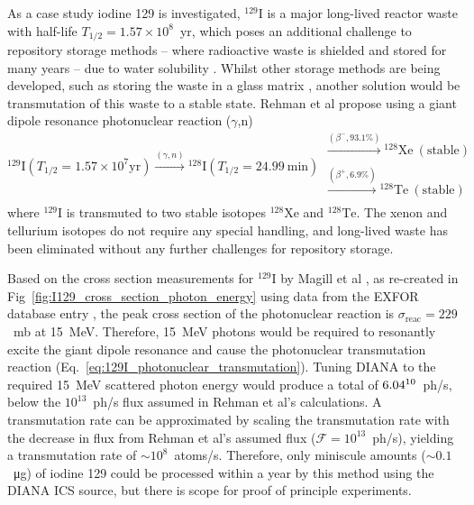 \documentclass[../main.tex]{subfiles}
\begin{document}
As a case study iodine 129 is investigated, $^{129}\mathrm{I}$ is a major long-lived reactor waste with half-life $T_{1/2} = 1.57\times 10^{8}$~yr, which poses an additional challenge to repository storage methods -- where radioactive waste is shielded and stored for many years -- due to water solubility \cite{cho2016reconsideration}. Whilst other storage methods are being developed, such as storing the waste in a glass matrix  \cite{lee2021chemical,morizet2021immobilization}, another solution would be transmutation of this waste to a stable state. Rehman et al \cite{ur2017optimization} propose using a giant dipole resonance photonuclear reaction ($\gamma$,n)
\begin{equation}
^{129}\mathrm{I} \left(T_{1/2}=1.57\times 10^{7}\textrm{yr}\right) \xrightarrow[]{\left(\gamma,n\right)} {}^{128}\mathrm{I} \left(T_{1/2}=24.99~\mathrm{\si{\minute}}\right) \substack{\xrightarrow[]{\left(\beta^{-},93.1\%\right)} {}^{128}\mathrm{Xe}~\left(\mathrm{stable}\right)\\[0.1em] \xrightarrow[]{\left(\beta^{+},6.9\%\right)} {}^{128}\mathrm{Te}~\left(\mathrm{stable}\right)}
\label{eq:129I_photonuclear_transmutation}
\end{equation}
where $^{129}\mathrm{I}$ is transmuted to two stable isotopes $^{128}\mathrm{Xe}$ and $^{128}\mathrm{Te}$. The xenon and tellurium isotopes do not require any special handling, and long-lived waste has been eliminated without any further challenges for repository storage.

Based on the cross section measurements for $^{129}\mathrm{I}$ by Magill et al \cite{magill2003laser}, as re-created in Fig~\ref{fig:I129_cross_section_photon_energy} using data from the EXFOR database entry \cite{zerkin2018experimental}, the peak cross section of the photonuclear reaction is $\sigma_{\mathrm{reac}} = 229$~\si{\milli\barn} at 15~\si{\mega\electronvolt}. Therefore, 15~\si{\mega\electronvolt} photons would be required to resonantly excite the giant dipole resonance and cause the photonuclear transmutation reaction (Eq.~\ref{eq:129I_photonuclear_transmutation}). Tuning DIANA to the required 15~\si{\mega\electronvolt} scattered photon energy would produce a total of $6.04\time 10^{10}$~ph/\si{\second}, below the $10^{13}$~ph/\si{\second} flux assumed in Rehman et al's \cite{ur2017optimization} calculations. A transmutation rate can be approximated by scaling the transmutation rate with the decrease in flux from Rehman et al's assumed flux ($\mathcal{F}=10^{13}$~ph/\si{\second}), yielding a transmutation rate of $\sim10^{8}$~atoms/\si{\second}. Therefore, only miniscule amounts ($\sim0.1$~\si{\micro\gram}) of iodine 129 could be processed within a year by this method using the DIANA ICS source, but there is scope for proof of principle experiments.
\end{document}

